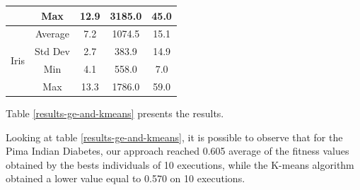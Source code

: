 \documentclass[journal]{IEEEtran}
\begin{document}
\begin{table}[]
\begin{tabular}{|c|c|c|c|c|}
			& Max                                      & 12.9                                                                                          & 3185.0                                                                                                          & 45.0                                                                                                \\ \hline
			\multirow{4}{*}{Iris}                  & Average                                  & 7.2                                                                                           & 1074.5                                                                                                          & 15.1                                                                                                \\ \cline{2-5} 
			& Std Dev                                  & 2.7                                                                                           & 383.9                                                                                                           & 14.9                                                                                                \\ \cline{2-5} 
			& Min                                      & 4.1                                                                                           & 558.0                                                                                                           & 7.0                                                                                                 \\ \cline{2-5} 
			& Max                                      & 13.3                                                                                          & 1786.0                                                                                                          & 59.0                                                                                                \\ \hline
		\end{tabular}
	\end{table}
	
	Table \ref{results-ge-and-kmeans} presents the results. 
	
	Looking at table \ref{results-ge-and-kmeans}, it is possible to observe that for the Pima Indian Diabetes, our approach reached 0.605 average of the fitness values obtained by the bests individuals of 10 executions, while the K-means algorithm obtained a lower value equal to 0.570 on 10 executions.
	 
\end{document}

